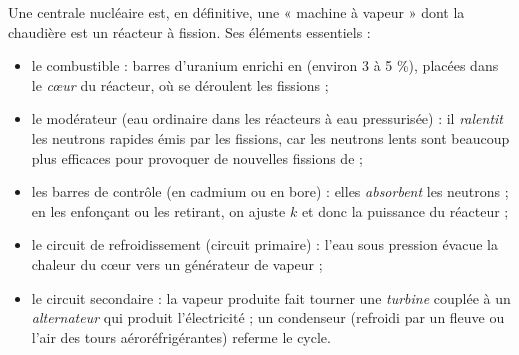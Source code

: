 \documentclass[11pt]{article}
\newcommand{\cle}[1]{{\popxbold\color{popdark}#1}}
\begin{document}
Une centrale nucléaire est, en définitive, une « machine à vapeur » dont la chaudière est un réacteur à fission. Ses éléments essentiels :

\begin{itemize}
\item le \cle{combustible} : barres d'uranium enrichi en  (environ 3 à 5 \%), placées dans le \emph{cœur} du réacteur, où se déroulent les fissions ;
\item le \cle{modérateur} (eau ordinaire dans les réacteurs à eau pressurisée) : il \emph{ralentit} les neutrons rapides émis par les fissions, car les neutrons lents sont beaucoup plus efficaces pour provoquer de nouvelles fissions de  ;
\item les \cle{barres de contrôle} (en cadmium ou en bore) : elles \emph{absorbent} les neutrons ; en les enfonçant ou les retirant, on ajuste $k$ et donc la puissance du réacteur ;
\item le \cle{circuit de refroidissement} (circuit primaire) : l'eau sous pression évacue la chaleur du cœur vers un générateur de vapeur ;
\item le circuit secondaire : la vapeur produite fait tourner une \emph{turbine} couplée à un \emph{alternateur} qui produit l'électricité ; un condenseur (refroidi par un fleuve ou l'air des tours aéroréfrigérantes) referme le cycle.
\end{itemize}
\end{document}
